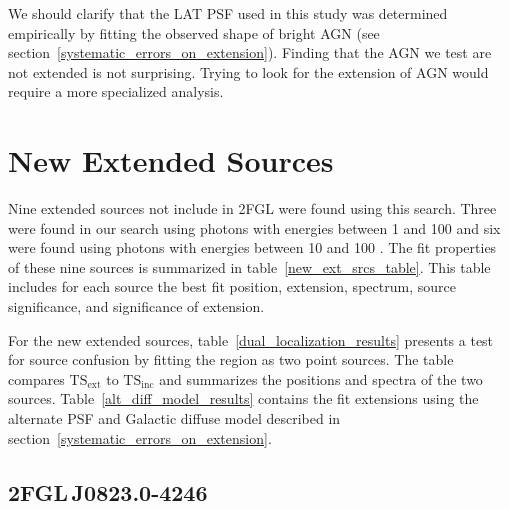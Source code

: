 \documentclass[12pt,preprint]{aastex}
\newcommand{\gev}{\text{GeV}\xspace}
\newcommand{\tsext}{{\ensuremath{\text{TS}_{\text{ext}}}}\xspace}
\newcommand{\tsinc}{\ensuremath{\text{TS}_{\text{inc}}}\xspace}
\begin{document}
We should clarify that the LAT PSF used in this study was determined
empirically by fitting the observed shape of bright AGN (see
section~\ref{systematic_errors_on_extension}). Finding that the AGN we
test are not extended is not surprising. Trying to look for the extension
of AGN would require a more specialized analysis.

\section{New Extended Sources}
\label{new_ext_srcs_section}



Nine extended sources not include in 2FGL were found using this search.
Three were found in our search using photons with energies between
1 \gev and 100 \gev and six were found using photons with energies between
10 \gev and 100 \gev.  The fit properties of these nine sources is summarized in
table~\ref{new_ext_srcs_table}.  This table includes for each source
the best fit position, extension, spectrum, source significance, and
significance of extension. 

For the new extended sources, table~\ref{dual_localization_results}
presents a test for source confusion by fitting the region
as two point sources. The table compares \tsext to \tsinc and
summarizes the positions and spectra of the two sources. 
Table~\ref{alt_diff_model_results} contains the fit extensions
using the alternate PSF and Galactic diffuse model described in
section~\ref{systematic_errors_on_extension}.

\subsection{2FGL\,J0823.0-4246}
\label{section_2FGL_J0823.0-4246}
\end{document}

